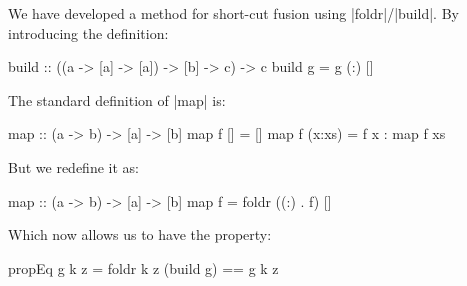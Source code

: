 We have developed a method for short-cut fusion using |foldr|/|build|. By introducing the definition:

\begin{code}
build :: ((a -> [a] -> [a]) -> [b] -> c) -> c
build g = g (:) []
\end{code}

The standard definition of |map| is:

\begin{code}
map :: (a -> b) -> [a] -> [b]
map f []      = []
map f (x:xs)  = f x : map f xs
\end{code}

But we redefine it as:

\begin{code}
map :: (a -> b) -> [a] -> [b]
map f = foldr ((:) . f) []
\end{code}

Which now allows us to have the property:

\begin{code}
propEq g k z = foldr k z (build g) == g k z
\end{code}
